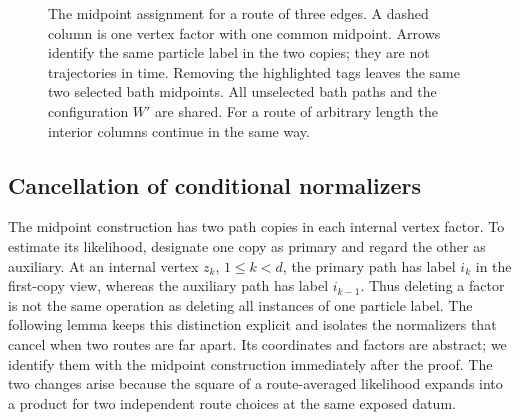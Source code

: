 \begin{figure}[t]
\centering
{}
\caption{The midpoint assignment for a route of three edges. A dashed
column is one vertex factor with one common midpoint. Arrows identify the
same particle label in the two copies; they are not trajectories in time.
Removing the highlighted tags leaves the same two selected bath midpoints.
All unselected bath paths and the configuration $W'$ are shared. For a
route of arbitrary length the interior columns continue in the same way.}
\label{cmp:shift-figure}
\end{figure}

\subsection{Cancellation of conditional normalizers}

The midpoint construction has two path copies in each internal vertex
factor. To estimate its likelihood, designate one copy as primary and regard
the other as auxiliary. At an internal vertex $z_k$, $1\le k<d$, the
primary path has label $i_k$ in the first-copy view, whereas the auxiliary
path has label
$i_{k-1}$. Thus deleting a factor is not the same operation as deleting all
instances of one particle label. The following lemma keeps this distinction
explicit and isolates the normalizers that cancel when two routes are far
apart. Its coordinates and factors are abstract; we identify them with the
midpoint construction immediately after the proof.
The two changes arise because the square of a route-averaged likelihood
expands into a product for two independent route choices at the same
exposed datum.

